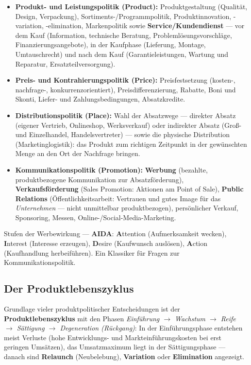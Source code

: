 \documentclass[11pt, a4paper]{article}
\begin{document}
\begin{itemize}
  \item \textbf{Produkt- und Leistungspolitik (Product):} Produktgestaltung (Qualität,
    Design, Verpackung), Sortiments-/Programmpolitik, Produktinnovation, -variation,
    -elimination, Markenpolitik sowie \textbf{Service/Kundendienst} --- vor dem Kauf
    (Information, technische Beratung, Problemlösungsvorschläge, Finanzierungsangebote),
    in der Kaufphase (Lieferung, Montage, Umtauschrecht) und nach dem Kauf
    (Garantieleistungen, Wartung und Reparatur, Ersatzteilversorgung).
  \item \textbf{Preis- und Kontrahierungspolitik (Price):} Preisfestsetzung
    (kosten-, nachfrage-, konkurrenzorientiert), Preisdifferenzierung, Rabatte, Boni und
    Skonti, Liefer- und Zahlungsbedingungen, Absatzkredite.
  \item \textbf{Distributionspolitik (Place):} Wahl der Absatzwege --- direkter Absatz
    (eigener Vertrieb, Onlineshop, Werksverkauf) oder indirekter Absatz (Groß- und
    Einzelhandel, Handelsvertreter) --- sowie die physische Distribution
    (Marketinglogistik): das Produkt zum richtigen Zeitpunkt in der gewünschten Menge an
    den Ort der Nachfrage bringen.
  \item \textbf{Kommunikationspolitik (Promotion):} \textbf{Werbung} (bezahlte,
    produktbezogene Kommunikation zur Absatzförderung), \textbf{Verkaufsförderung}
    (Sales Promotion: Aktionen am Point of Sale), \textbf{Public Relations}
    (Öffentlichkeitsarbeit: Vertrauen und gutes Image für das \emph{Unternehmen} ---
    nicht unmittelbar produktbezogen), persönlicher Verkauf, Sponsoring, Messen,
    Online-/Social-Media-Marketing.
\end{itemize}

\begin{eselsbruecke}
Stufen der Werbewirkung --- \textbf{AIDA}: \textbf{A}ttention (Aufmerksamkeit wecken),
\textbf{I}nterest (Interesse erzeugen), \textbf{D}esire (Kaufwunsch auslösen),
\textbf{A}ction (Kaufhandlung herbeiführen). Ein Klassiker für Fragen zur
Kommunikationspolitik.
\end{eselsbruecke}

\subsection{Der Produktlebenszyklus}

Grundlage vieler produktpolitischer Entscheidungen ist der \textbf{Produktlebenszyklus}
mit den Phasen \emph{Einführung $\rightarrow$ Wachstum $\rightarrow$ Reife $\rightarrow$
Sättigung $\rightarrow$ Degeneration (Rückgang)}: In der Einführungsphase entstehen
meist Verluste (hohe Entwicklungs- und Markteinführungskosten bei erst geringen
Umsätzen), das Umsatzmaximum liegt in der Sättigungsphase --- danach sind
\textbf{Relaunch} (Neubelebung), \textbf{Variation} oder \textbf{Elimination} angezeigt.
\end{document}
